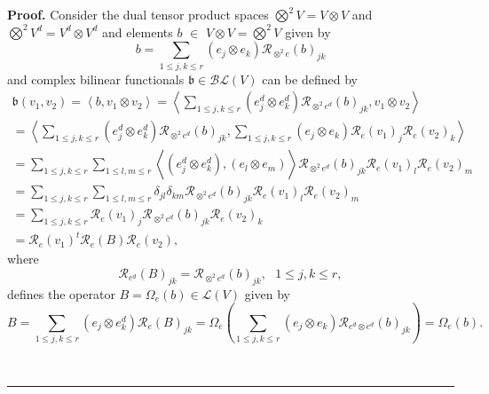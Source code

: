 \documentclass[aps,preprint]{revtex4}%
\newenvironment{proof}[1][Proof]{\noindent\textbf{#1.} }{\ \rule{0.5em}{0.5em}}
\begin{document}
\begin{proof}
Consider the dual tensor product spaces $\bigotimes\nolimits^{2}V=V\otimes V$
and $\bigotimes\nolimits^{2}V^{d}=V^{d}\otimes V^{d}$ and elements $b$ $\in$
$V\otimes V=\bigotimes\nolimits^{2}V$ given by
\begin{equation}
b=\sum_{1\leq j,k\leq r}\left(  e_{j}\otimes e_{k}\right)  \mathcal{R}%
_{\otimes^{2}e}\left(  b\right)  _{jk}%
\end{equation}
and complex bilinear functionals $\mathfrak{b}\in\mathcal{BL}\left(  V\right)
$ can be defined by
\begin{gather}
\mathfrak{b}\left(  v_{1},v_{2}\right)  =\left\langle b,v_{1}\otimes
v_{2}\right\rangle =\left\langle \sum_{1\leq j,k\leq r}\left(  e_{j}%
^{d}\otimes e_{k}^{d}\right)  \mathcal{R}_{\otimes^{2}e^{d}}\left(  b\right)
_{jk},v_{1}\otimes v_{2}\right\rangle \\
=\left\langle \sum_{1\leq j,k\leq r}\left(  e_{j}^{d}\otimes e_{k}^{d}\right)
\mathcal{R}_{\otimes^{2}e^{d}}\left(  b\right)  _{jk},\sum_{1\leq j,k\leq
r}\left(  e_{j}\otimes e_{k}\right)  \mathcal{R}_{e}\left(  v_{1}\right)
_{j}\mathcal{R}_{e}\left(  v_{2}\right)  _{k}\right\rangle \\
=\sum_{1\leq j,k\leq r}\sum_{1\leq l,m\leq r}\left\langle \overset{}{\left(
e_{j}^{d}\otimes e_{k}^{d}\right)  ,\left(  e_{l}\otimes e_{m}\right)
}\right\rangle \mathcal{R}_{\otimes^{2}e^{d}}\left(  b\right)  _{jk}%
\mathcal{R}_{e}\left(  v_{1}\right)  _{l}\mathcal{R}_{e}\left(  v_{2}\right)
_{m}\\
=\sum_{1\leq j,k\leq r}\sum_{1\leq l,m\leq r}\delta_{jl}\delta_{km}%
\mathcal{R}_{\otimes^{2}e^{d}}\left(  b\right)  _{jk}\mathcal{R}_{e}\left(
v_{1}\right)  _{l}\mathcal{R}_{e}\left(  v_{2}\right)  _{m}\\
=\sum_{1\leq j,k\leq r}\mathcal{R}_{e}\left(  v_{1}\right)  _{j}%
\mathcal{R}_{\otimes^{2}e^{d}}\left(  b\right)  _{jk}\mathcal{R}_{e}\left(
v_{2}\right)  _{k}\\
=\mathcal{R}_{e}\left(  v_{1}\right)  ^{t}\mathcal{R}_{e}\left(  B\right)
\mathcal{R}_{e}\left(  v_{2}\right)  ,
\end{gather}
where%
\begin{equation}
\mathcal{R}_{e^{d}}\left(  B\right)  _{jk}=\mathcal{R}_{\otimes^{2}e^{d}%
}\left(  b\right)  _{jk},\text{ }1\leq j,k\leq r,
\end{equation}
defines the operator $B=\Omega_{e}\left(  b\right)  \in\mathcal{L}\left(
V\right)  $ given by
\begin{equation}
B=\sum_{1\leq j,k\leq r}\left(  e_{j}\otimes e_{k}^{d}\right)  \mathcal{R}%
_{e}\left(  B\right)  _{jk}=\Omega_{e}\left(  \sum_{1\leq j,k\leq r}\left(
e_{j}\otimes e_{k}\right)  \mathcal{R}_{e^{d}\otimes e^{d}}\left(  b\right)
_{jk}\right)  =\Omega_{e}\left(  b\right)  .
\end{equation}

\end{proof}
\end{document}

